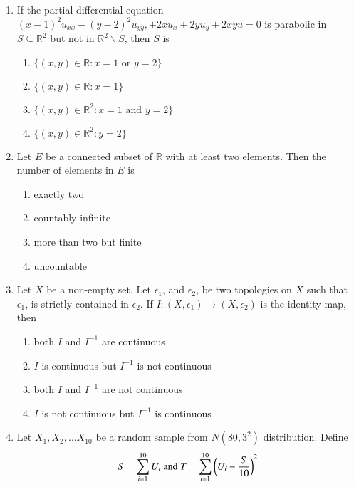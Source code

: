 \documentclass[journal]{IEEEtran}
\begin{document}
\begin{enumerate}
\item{ If the partial differential equation $(x-1)^2 u_{xx}-(y-2)^2u_{yy}, +2xu_x + 2yu_y +2xyu=0$ is parabolic in $S \subseteq \mathbb{R}^2$ but not in $\mathbb{R}^2\backslash S$, then $S$ is
\begin{multicols}{2}
    \begin{enumerate}
        \item $\{(x, y) \in \mathbb{R}:x=1 \text{ or } y=2\}$
        \item $\{(x,y) \in \mathbb{R}:x=1\}$
        \item $\{(x, y) \in \mathbb{R}^2:x=1 \text{ and } y = 2\}$
        \item $\{(x, y) \in \mathbb{R}^2: y=2\}$
    \end{enumerate}
\end{multicols}




}

\item{ Let $E$ be a connected subset of $\mathbb{R}$ with at least two elements. Then the number of elements in $E$ is
\begin{multicols}{2}
    \begin{enumerate}
        \item exactly two
        \item countably infinite
        \item more than two but finite 
        \item uncountable
    \end{enumerate}
\end{multicols}
}

\item{ Let $X$ be a non-empty set. Let $\epsilon_1$, and $\epsilon_2$, be two topologies on $X$ such that $\epsilon_1$, is strictly contained in $\epsilon_2$. If $I: (X,\epsilon_1)\rightarrow (X,\epsilon_2)$ is the identity map, then
    \begin{enumerate}
        \item both $I$ and $I^{-1}$ are continuous
        \item $I$ is continuous but $I^{-1}$ is not continuous
        \item both $I$ and $I^{-1}$ are not continuous
        \item $I$ is not continuous but $I^{-1}$ is continuous
    \end{enumerate}
}

\item{ Let $X_1, X_2, \ldots X_{10}$ be a random sample from $N(80,3^2)$ distribution. Define 
$$S=\sum_{i=1}^{10}U_i \text{ and } T=\sum_{i=1}^{10}\left(U_i - \frac{S}{10}\right)^2$$

}
\end{enumerate}
\end{document}
